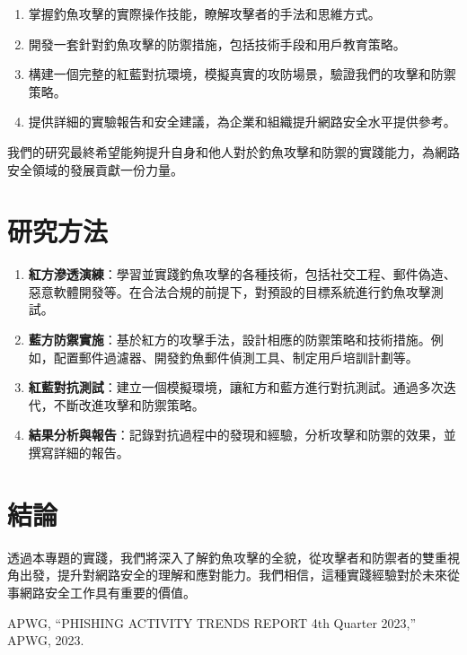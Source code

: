 \documentclass[a4paper,12pt]{article}
\begin{document}
\begin{enumerate}
  \item 掌握釣魚攻擊的實際操作技能，瞭解攻擊者的手法和思維方式。
  \item 開發一套針對釣魚攻擊的防禦措施，包括技術手段和用戶教育策略。
  \item 構建一個完整的紅藍對抗環境，模擬真實的攻防場景，驗證我們的攻擊和防禦策略。
  \item 提供詳細的實驗報告和安全建議，為企業和組織提升網路安全水平提供參考。
\end{enumerate}

我們的研究最終希望能夠提升自身和他人對於釣魚攻擊和防禦的實踐能力，為網路安全領域的發展貢獻一份力量。

\section{研究方法}
\begin{enumerate}
  \item \textbf{紅方滲透演練}：學習並實踐釣魚攻擊的各種技術，包括社交工程、郵件偽造、惡意軟體開發等。在合法合規的前提下，對預設的目標系統進行釣魚攻擊測試。
  \item \textbf{藍方防禦實施}：基於紅方的攻擊手法，設計相應的防禦策略和技術措施。例如，配置郵件過濾器、開發釣魚郵件偵測工具、制定用戶培訓計劃等。
  \item \textbf{紅藍對抗測試}：建立一個模擬環境，讓紅方和藍方進行對抗測試。通過多次迭代，不斷改進攻擊和防禦策略。
  \item \textbf{結果分析與報告}：記錄對抗過程中的發現和經驗，分析攻擊和防禦的效果，並撰寫詳細的報告。
\end{enumerate}

\section{結論}
透過本專題的實踐，我們將深入了解釣魚攻擊的全貌，從攻擊者和防禦者的雙重視角出發，提升對網路安全的理解和應對能力。我們相信，這種實踐經驗對於未來從事網路安全工作具有重要的價值。

\begin{thebibliography}{9}
   APWG, ``PHISHING ACTIVITY TRENDS REPORT 4th Quarter 2023,'' APWG, 2023.
\end{thebibliography}
\end{document}
